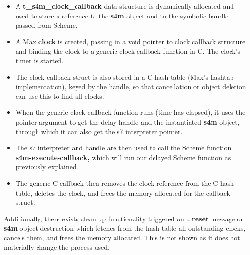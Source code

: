 \documentclass[acmsmall]{acmart}
\begin{document}
\begin{itemize}
\item A \textbf{t\_s4m\_clock\_callback} data structure is dynamically allocated and used to store a
  reference to the \textbf{s4m} object and to the symbolic handle passed from Scheme.
\item A Max \textbf{clock} is created, passing in a void pointer to clock callback structure
  and binding the clock to a generic clock callback function in C. The clock's timer is started.
\item The clock callback struct is also stored in a C hash-table (Max's hashtab implementation),
  keyed by the handle, so that cancellation or object deletion can use this to find all clocks.
\item When the generic clock callback function runs (time has elapsed), it uses the pointer argument to get 
  the delay handle and the instantiated \textbf{s4m} object, through which it 
  can also get the s7 interpreter pointer.
\item The s7 interpreter and handle are then used to call the Scheme function
  \textbf{s4m-execute-callback,} which will run our delayed Scheme function as previously explained.
\item The generic C callback then removes the clock reference from the C hash-table,
  deletes the clock, and frees the memory allocated for the callback struct.
\end{itemize}

Additionally, there exists clean up functionality triggered on a \textbf{reset} message or 
\textbf{s4m} object destruction which fetches from the hash-table all outstanding clocks, 
cancels them, and frees the memory allocated.
This is not shown as it does not materially change the process used.
\end{document}
